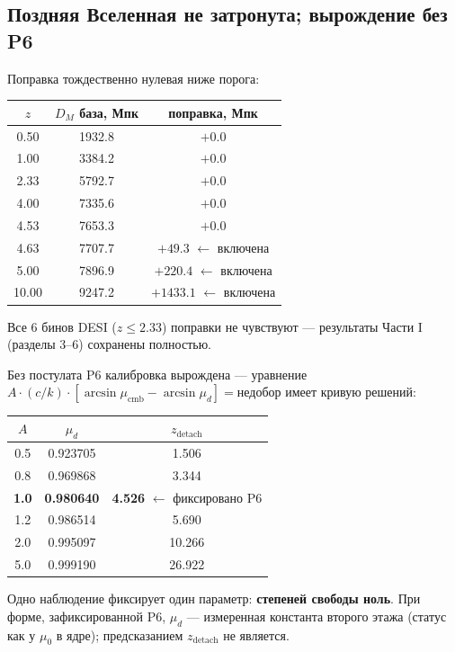 \documentclass{article}
\begin{document}
\subsection{Поздняя Вселенная не затронута; вырождение без P6}

Поправка тождественно нулевая ниже порога:

\begin{center}
\small
\begin{tabular}{@{}ccc@{}}
\toprule
$z$ & $D_M$ база, Мпк & поправка, Мпк \\
\midrule
0.50 & 1932.8 & $+0.0$ \\
1.00 & 3384.2 & $+0.0$ \\
2.33 & 5792.7 & $+0.0$ \\
4.00 & 7335.6 & $+0.0$ \\
4.53 & 7653.3 & $+0.0$ \\
4.63 & 7707.7 & $+49.3$ $\leftarrow$ включена \\
5.00 & 7896.9 & $+220.4$ $\leftarrow$ включена \\
10.00 & 9247.2 & $+1433.1$ $\leftarrow$ включена \\
\bottomrule
\end{tabular}
\end{center}

Все 6 бинов DESI ($z \le 2.33$) поправки не чувствуют --- результаты Части I (разделы 3--6) сохранены полностью.

Без постулата P6 калибровка вырождена --- уравнение $A\cdot(c/k)\cdot[\arcsin\mu_{\text{cmb}} - \arcsin\mu_d] = \text{недобор}$ имеет кривую решений:

\begin{center}
\small
\begin{tabular}{@{}ccc@{}}
\toprule
$A$ & $\mu_d$ & $z_{\text{detach}}$ \\
\midrule
0.5 & 0.923705 & 1.506 \\
0.8 & 0.969868 & 3.344 \\
\textbf{1.0} & \textbf{0.980640} & \textbf{4.526} $\leftarrow$ фиксировано P6 \\
1.2 & 0.986514 & 5.690 \\
2.0 & 0.995097 & 10.266 \\
5.0 & 0.999190 & 26.922 \\
\bottomrule
\end{tabular}
\end{center}

Одно наблюдение фиксирует один параметр: \textbf{степеней свободы ноль}. При форме, зафиксированной P6, $\mu_d$ --- измеренная константа второго этажа (статус как у $\mu_0$ в ядре); предсказанием $z_{\text{detach}}$ не является.
\end{document}
